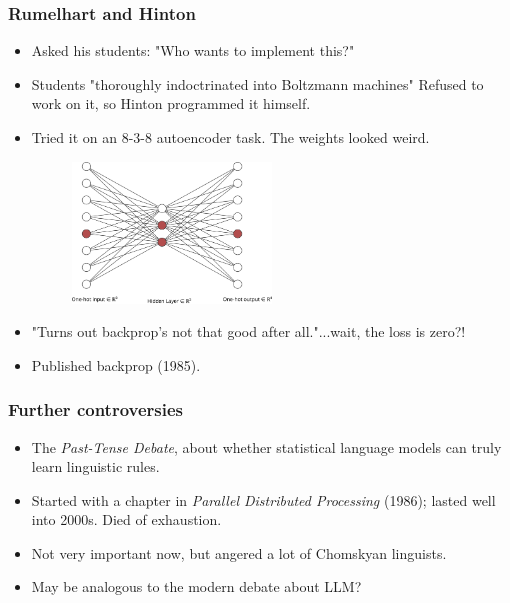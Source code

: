 \documentclass{beamer}
\begin{document}
\begin{frame}
\frametitle{Rumelhart and Hinton}

\begin{itemize}
    \item Asked his students: "Who wants to implement this?" 
    \item Students "thoroughly indoctrinated into Boltzmann machines" Refused to work on it, so Hinton programmed it himself.
    \item Tried it on an 8-3-8 autoencoder task. The weights looked weird.
    \begin{figure}[t]
        \includegraphics[width=0.5\textwidth]{figure/Hinton_8-3-8_autoencoder.png}
        \centering
    \end{figure}
    \item "Turns out backprop's not that good after all."...\pause wait, the loss is zero?!
    \item Published backprop (1985).
\end{itemize}
\end{frame}

\begin{frame}
\frametitle{Further controversies}
    
\begin{itemize}
    \item The \textit{Past-Tense Debate}, about whether statistical language models can truly learn linguistic rules.
    \item Started with a chapter in \textit{Parallel Distributed Processing} (1986); lasted well into 2000s. Died of exhaustion. \cite{seidenbergQuasiregularityItsDiscontents2014}
    \item Not very important now, but angered a lot of Chomskyan linguists.
    \item May be analogous to the modern debate about LLM?
\end{itemize}
\end{frame}
\end{document}
